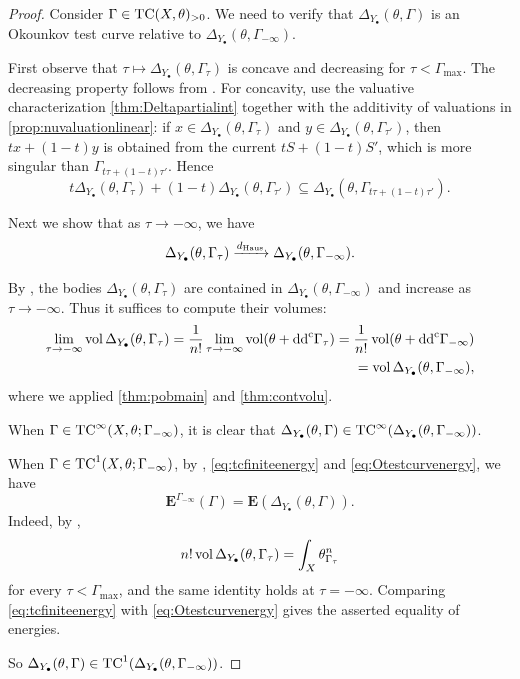 \begin{proof}
    Consider $\Gamma\in \mathrm{TC}(X,\theta)_{>0}$. We need to verify that $\Delta_{Y_{\bullet}}(\theta,\Gamma)$ is an Okounkov test curve relative to $\Delta_{Y_{\bullet}}(\theta,\Gamma_{-\infty})$.

    First observe that $\tau\mapsto \Delta_{Y_{\bullet}}(\theta,\Gamma_{\tau})$ is concave and decreasing for $\tau<\Gamma_{\max}$. The decreasing property follows from . For concavity, use the valuative characterization \cref{thm:Deltapartialint} together with the additivity of valuations in \cref{prop:nuvaluationlinear}: if $x\in\Delta_{Y_\bullet}(\theta,\Gamma_\tau)$ and $y\in\Delta_{Y_\bullet}(\theta,\Gamma_{\tau'})$, then $tx+(1-t)y$ is obtained from the current $tS+(1-t)S'$, which is more singular than $\Gamma_{t\tau+(1-t)\tau'}$. Hence
    \[
        t\Delta_{Y_\bullet}\left(\theta,\Gamma_\tau\right)+(1-t)\Delta_{Y_\bullet}\left(\theta,\Gamma_{\tau'}\right)\subseteq\Delta_{Y_\bullet}\left(\theta,\Gamma_{t\tau+(1-t)\tau'}\right).
    \]

    Next we show that as $\tau\to -\infty$, we have
    \[
    \Delta_{Y_{\bullet}}(\theta,\Gamma_{\tau})\xrightarrow{d_{\mathrm{Haus}}}\Delta_{Y_{\bullet}}(\theta,\Gamma_{-\infty}).
    \]

    By , the bodies $\Delta_{Y_{\bullet}}(\theta,\Gamma_{\tau})$ are contained in $\Delta_{Y_{\bullet}}(\theta,\Gamma_{-\infty})$ and increase as $\tau\to-\infty$. Thus it suffices to compute their volumes:
    \[
    \begin{split}
    \lim_{\tau\to -\infty}\operatorname{vol} \Delta_{Y_{\bullet}}(\theta,\Gamma_{\tau})=\frac{1}{n!}\lim_{\tau\to -\infty}\operatorname{vol} (\theta+\mathrm{dd}^{\mathrm{c}}\Gamma_{\tau})=\frac{1}{n!}\operatorname{vol} (\theta+\mathrm{dd}^{\mathrm{c}} \Gamma_{-\infty}) \\
    =\operatorname{vol} \Delta_{Y_{\bullet}}(\theta,\Gamma_{-\infty}),
    \end{split}
    \]
    where we applied \cref{thm:pobmain} and \cref{thm:contvolu}.

    When $\Gamma\in \mathrm{TC}^{\infty}(X,\theta;\Gamma_{-\infty})$, it is clear that $\Delta_{Y_{\bullet}}(\theta,\Gamma)\in \mathrm{TC}^{\infty}(\Delta_{Y_{\bullet}}(\theta,\Gamma_{-\infty}))$.

    When $\Gamma\in \mathrm{TC}^{1}(X,\theta;\Gamma_{-\infty})$, by , \eqref{eq:tcfiniteenergy} and \eqref{eq:Otestcurvenergy}, we have
    \[
    \mathbf{E}^{\Gamma_{-\infty}}(\Gamma)=\mathbf{E}(\Delta_{Y_{\bullet}}(\theta,\Gamma)).
    \]
    Indeed, by ,
    \[
        n!\operatorname{vol}\Delta_{Y_{\bullet}}(\theta,\Gamma_\tau)=\int_X\theta_{\Gamma_\tau}^n
    \]
    for every $\tau<\Gamma_{\max}$, and the same identity holds at $\tau=-\infty$. Comparing \eqref{eq:tcfiniteenergy} with \eqref{eq:Otestcurvenergy} gives the asserted equality of energies.

    So $\Delta_{Y_{\bullet}}(\theta,\Gamma)\in \mathrm{TC}^1(\Delta_{Y_{\bullet}}(\theta,\Gamma_{-\infty}))$.
\end{proof}


